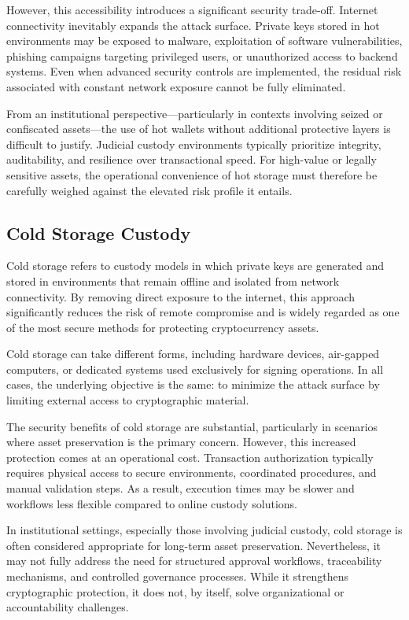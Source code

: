 \documentclass[12pt,a4paper]{report}
\begin{document}
However, this accessibility introduces a significant security trade-off. Internet connectivity inevitably expands the attack surface. Private keys stored in hot environments may be exposed to malware, exploitation of software vulnerabilities, phishing campaigns targeting privileged users, or unauthorized access to backend systems. Even when advanced security controls are implemented, the residual risk associated with constant network exposure cannot be fully eliminated.

From an institutional perspective—particularly in contexts involving seized or confiscated assets—the use of hot wallets without additional protective layers is difficult to justify. Judicial custody environments typically prioritize integrity, auditability, and resilience over transactional speed. For high-value or legally sensitive assets, the operational convenience of hot storage must therefore be carefully weighed against the elevated risk profile it entails.

\subsection{Cold Storage Custody}

Cold storage refers to custody models in which private keys are generated and stored in environments that remain offline and isolated from network connectivity. By removing direct exposure to the internet, this approach significantly reduces the risk of remote compromise and is widely regarded as one of the most secure methods for protecting cryptocurrency assets.

Cold storage can take different forms, including hardware devices, air-gapped computers, or dedicated systems used exclusively for signing operations. In all cases, the underlying objective is the same: to minimize the attack surface by limiting external access to cryptographic material.

The security benefits of cold storage are substantial, particularly in scenarios where asset preservation is the primary concern. However, this increased protection comes at an operational cost. Transaction authorization typically requires physical access to secure environments, coordinated procedures, and manual validation steps. As a result, execution times may be slower and workflows less flexible compared to online custody solutions.

In institutional settings, especially those involving judicial custody, cold storage is often considered appropriate for long-term asset preservation. Nevertheless, it may not fully address the need for structured approval workflows, traceability mechanisms, and controlled governance processes. While it strengthens cryptographic protection, it does not, by itself, solve organizational or accountability challenges.
\end{document}
